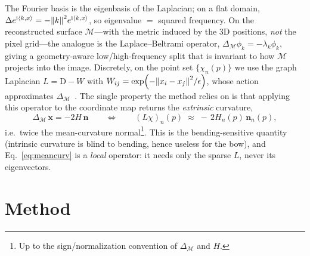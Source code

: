\documentclass{article}
\begin{document}
The Fourier basis is the eigenbasis of the Laplacian; on a flat domain,
$\Delta e^{\mathrm i\langle k,x\rangle}=-\norm{k}^2 e^{\mathrm i\langle k,x\rangle}$,
so eigenvalue $=$ squared frequency. On the reconstructed surface
$\mathcal M$---with the metric induced by the 3D positions, \emph{not} the pixel
grid---the analogue is the Laplace--Beltrami operator, $\Delta_{\mathcal M}\phi_k=-\lambda_k\phi_k$,
giving a geometry-aware low/high-frequency split that is invariant to how
$\mathcal M$ projects into the image. Discretely, on the point set
$\{\chi_n(p)\}$ we use the graph Laplacian $L=\mathrm D-W$ with
$W_{ij}=\exp(-\norm{x_i-x_j}^2/\epsilon)$, whose action approximates
$\Delta_{\mathcal M}$~\cite{belkin2003laplacian}. The single property the method relies
on is that applying this operator to the coordinate map returns the
\emph{extrinsic} curvature,
\begin{equation}
\Delta_{\mathcal M}\,\mathbf x=-2H\,\mathbf n
\qquad\Longleftrightarrow\qquad
(L\chi)_n(p)\;\approx\;-\,2H_n(p)\,\mathbf n_n(p),
\label{eq:meancurv}
\end{equation}
i.e.\ twice the mean-curvature normal\footnote{Up to the sign/normalization
convention of $\Delta_{\mathcal M}$ and $H$.}. This is the bending-sensitive
quantity (intrinsic curvature is blind to bending, hence useless for the bow),
and Eq.~\eqref{eq:meancurv} is a \emph{local} operator: it needs only the
sparse $L$, never its eigenvectors.

\section{Method}
\end{document}
